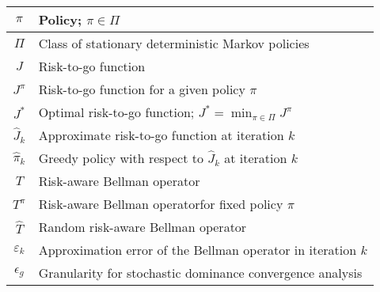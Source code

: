 \documentclass[12pt,technote,onecolumn]{IEEEtran}
\begin{document}
\begin{table}[!tph]
\begin{tabular}{|c|l|}
		$\pi$                                                                  & Policy; $\pi\in\Pi$                                                                                  \\ \hline
		$\Pi$                                                                  & Class of stationary deterministic Markov policies                                                    \\ \hline
		$J$                                                                    & Risk-to-go function                                                                                  \\ \hline
		$J^{\pi}$                                                              & Risk-to-go function for a given policy $\pi$                                                         \\ \hline
		$J^{*}$                                                                & Optimal risk-to-go function; $J^{*}=\min_{\pi\in\Pi}J^{\pi}$                                         \\ \hline
		$\widehat{J}_{k}$                                                      & Approximate risk-to-go function at iteration $k$                                                     \\ \hline
		$\widehat{\pi}_{k}$                                                    & Greedy policy with respect to $\widehat{J}_{k}$ at iteration $k$                                     \\ \hline
		$T$                                                                    & Risk-aware Bellman operator                                                                          \\ \hline
		$T^{\pi}$                                                              & Risk-aware Bellman operatorfor fixed policy $\pi$                                                    \\ \hline
		$\widehat{T}$                                                          & Random risk-aware Bellman operator                                                                   \\ \hline
		$\varepsilon_{k}$                                                      & Approximation error of the Bellman operator in iteration $k$                                         \\ \hline
		$\epsilon_{g}$                                                         & Granularity for stochastic dominance convergence analysis                                            \\ \hline
	\end{tabular}
\end{table}
\end{document}
